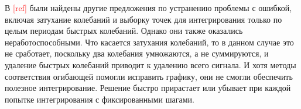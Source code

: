\documentclass[A4,12pt,oneside]{article}
\renewcommand{\(}{\left(}
\renewcommand{\)}{\right)}
\newcommand{\citeph}{\textcolor{red}{[ref] }}
\begin{document}
В \citeph были найдены другие предложения по устранению проблемы с ошибкой, включая затухание колебаний и выборку точек для интегрирования только по целым периодам быстрых колебаний. Однако они также оказались неработоспособными. Что касается затухания колебаний, то в данном случае это не сработает, поскольку два колебания умножаются, а не суммируются, и удаление быстрых колебаний приводит к удалению всего сигнала. И хотя методы соответствия огибающей помогли исправить графику, они не смогли обеспечить полезное интегрирование. Решение быстро прирастает или убывает при каждой попытке интегрирования с фиксированными шагами.

\end{document}
